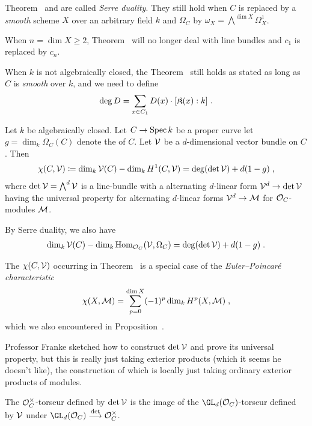 \documentclass[a4paper,parskip=half,numbers=enddot, DIV=12]{scrreprt}
\begin{document}
\begin{rem*}
	\begin{alphanumerate}
		\item Theorem~ and  are called \emph{Serre duality}. They still hold when $C$ is replaced by a \emph{smooth} scheme $X$ over an arbitrary field $k$ and $\Omega_C$ by $\omega_X=\bigwedge^{\dim X}\Omega_X^1$.
		\item When $n=\dim X\geq 2$, Theorem~ will no longer deal with line bundles and $c_1$ is replaced by $c_n$.
		\item When $k$ is not algebraically closed, the Theorem~ still holds as stated as long as $C$ is \emph{smooth} over $k$, and we need to define
		\begin{align*}
			\deg D=\sum_{x\in C_1} D(x)\cdot [\mathfrak{K}(x):k]\;.
		\end{align*}
	\end{alphanumerate}
\end{rem*}
\begin{thm}
	Let $k$ be algebraically closed. Let $C\morphism\Spec k$ be a proper curve let $g=\dim_k\Omega_C(C)$ denote the  of $C$. Let $\mathcal{V}$ be a $d$-dimensional vector bundle on $C$. Then
	\begin{align}\lbl{eq:RiemannRoch1}
		\chi(C,\Vv)\coloneqq\dim_k\Vv(C)-\dim_k H^1(C,\Vv)=\deg(\det\Vv)+d(1-g)\;,
	\end{align}
	where $\operatorname{det} \mathcal{V}=\bigwedge^d\mathcal{V}$ is a line-bundle with a alternating $d$-linear form $\Vv^d\morphism\det\Vv$ having the universal property for alternating $d$-linear forms $\Vv^d\morphism\Mm$ for $\mathcal{O}_C$-modules $\mathcal{M}$.
	
	By Serre duality, we also have
	\begin{align}\lbl{eq:RiemannRoch2}
		\dim_k\Vv(C)-\dim_k\Hom_{\Oo_C}(\Vv,\Omega_C)=\deg(\det\Vv)+d(1-g)\;.
	\end{align}
\end{thm}
\begin{rem*}
	\begin{alphanumerate}
		\item The $\chi(C,\mathcal{V})$ occurring in Theorem~ is a special case of the \emph{Euler--Poincaré characteristic}
		\begin{align*}
			\chi(X,\mathcal{M})=\sum_{p=0}^{\dim X}(-1)^p\dim_kH^p(X,\mathcal{M})\;,
		\end{align*}
		which we also encountered in Proposition~\reff{prop:SerreAgain}.
		\item Professor Franke sketched how to construct $\operatorname{det}\mathcal{V}$ and prove its universal property, but this is really just taking exterior products (which it seems he doesn't like), the construction of which is locally just taking ordinary  exterior products of modules.
		
		The $\mathcal{O}_C^\times$-torseur defined by $\operatorname{det}\mathcal{V}$ is the image of the $\GL_d(\Oo_C)$-torseur defined by $\mathcal{V}$ under $\GL_d(\Oo_C)\morphism[\det]\Oo_C^\times$.
	\end{alphanumerate}
\end{rem*}
\end{document}

